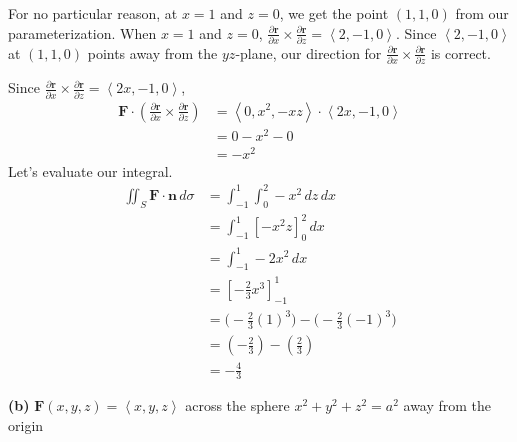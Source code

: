 \documentclass{article}
\newcommand{\lrp}[1]{\left( #1 \right)}
\newcommand{\lra}[1]{\left\langle #1 \right\rangle}
\newcommand{\lrb}[1]{\left[ #1 \right]}
\renewcommand{\r}[0]{\mathbf{r}}
\newcommand{\F}[0]{\mathbf{F}}
\newcommand{\n}[0]{\mathbf{n}}
\begin{document}
For no particular reason, at $x=1$ and $z=0$, we get the point $(1,1,0)$ from our parameterization. When $x=1$ and $z=0$, $\displaystyle\frac{\partial \r}{\partial x}\times \frac{\partial \r}{\partial z}=\lra{2,-1,0}$. Since $\lra{2,-1,0}$ at $(1,1,0)$ points away from the $yz$-plane, our direction for $\displaystyle  \frac{\partial \r}{\partial x}\times \frac{\partial \r}{\partial z}$ is correct.
\begin{center}
\end{center}

Since $\displaystyle  \frac{\partial \r}{\partial x}\times \frac{\partial \r}{\partial z}=\lra{2x,-1,0}$,
\begin{align*}
    \F \cdot \lrp{ \frac{\partial \r}{\partial x}\times \frac{\partial \r}{\partial z}}&=\lra{0,x^2,-xz}\cdot \lra{2x,-1,0}\\
    &=0-x^2-0\\
    &=-x^2
\end{align*}
Let's evaluate our integral.
\begin{align*}
    \iint_S \F\cdot \n \,d\sigma &=\int_{-1}^1\int_0^2 -x^2\,dz\,dx\\
    &=\int_{-1}^1\lrb{-x^2z}_0^2\,dx\\
    &=\int_{-1}^1 -2x^2\,dx\\
    &=\lrb{-\frac{2}{3}x^3}_{-1}^1\\
    &=\Big(-\frac{2}{3}(1)^3\Big)-\Big(-\frac{2}{3}\lrp{-1}^3\Big)\\
    &=\lrp{-\frac{2}{3}}-\lrp{\frac{2}{3}}\\
    &=\boxed{-\frac{4}{3}}
\end{align*}

\newpage
{}
{}\textbf{(b)} $\F(x,y,z)=\lra{x,y,z}$ across the sphere $x^2+y^2+z^2=a^2$ away from the origin
\end{document}
